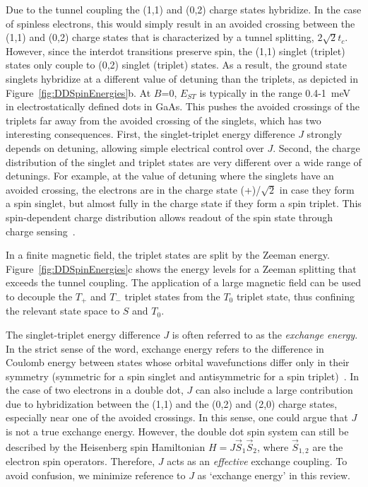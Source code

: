 \documentclass[12pt,aps,nofootinbib]{revtex4-1}
\begin{document}
Due to the tunnel coupling the (1,1) and (0,2) charge states
hybridize. In the case of spinless electrons, this would simply
result in an avoided crossing between the (1,1) and (0,2) charge
states that is characterized by a tunnel splitting, $2\sqrt{2}
t_c$. However, since the interdot transitions preserve spin, the
(1,1) singlet (triplet) states only couple to (0,2)
singlet (triplet) states. As a result, the ground state singlets
hybridize at a different value of detuning than the triplets, as depicted
in Figure~\ref{fig:DDSpinEnergies}b. At $B$=0, $E_{ST}$ is typically in the range 0.4-1~meV in electrostatically defined dots in GaAs.
This pushes the avoided crossings of the triplets far away from
the avoided crossing of the singlets, which has two interesting consequences.
First, the singlet-triplet energy difference $J$ strongly depends on detuning, allowing simple electrical control over $J$.
Second, the charge distribution of the singlet and triplet states are very different over a wide
range of detunings. For example, at the value of detuning where the
singlets have an avoided crossing, the electrons are in the charge state
(+)/$\sqrt{2}$ in case they form a spin
singlet, but almost fully in the charge state  if they
form a spin triplet. This spin-dependent charge distribution
allows readout of the spin state through charge sensing~\cite{TaylerNaturePhysics2005,EngelPRL2004}.

In a finite magnetic field, the triplet states are split by the
Zeeman energy. Figure~\ref{fig:DDSpinEnergies}c shows the energy
levels for a Zeeman splitting that exceeds the tunnel coupling.
The application of a large magnetic field can be used to decouple
the $T_+$ and $T_-$ triplet states from the $T_0$ triplet state,
thus confining the relevant state space to $S$ and $T_0$.

The singlet-triplet energy difference $J$ is often referred to as the \textit{exchange energy}. In the strict sense of the word, exchange energy refers to the difference in Coulomb energy between states whose orbital wavefunctions differ only in their symmetry (symmetric for a spin singlet and antisymmetric for a spin triplet)~\cite{ashcroft}. In the case of two electrons in a double dot, $J$ can also include a large contribution due to hybridization between the (1,1) and the (0,2) and (2,0) charge states, especially near one of the avoided crossings. In this sense, one could argue that $J$ is not a true exchange energy. However, the double dot spin system can still be described by the Heisenberg spin Hamiltonian $H= J \vec{S}_1 \vec{S}_2$, where $\vec{S}_{1,2}$ are the electron spin operators. Therefore, $J$ acts as an \textit{effective} exchange coupling. To avoid confusion, we minimize reference to $J$ as `exchange energy' in this review.
\end{document}
